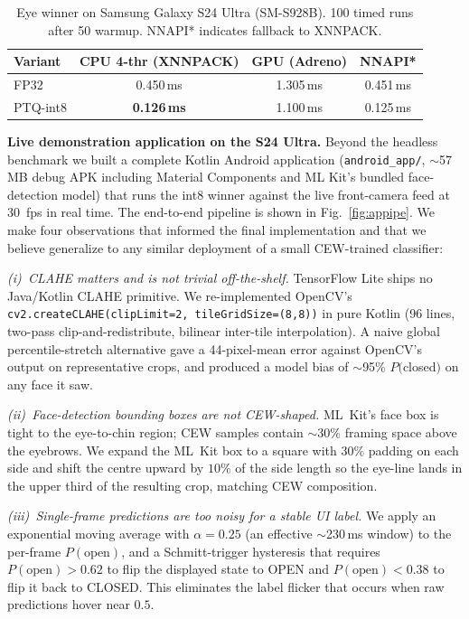 \documentclass[conference]{IEEEtran}
\begin{document}
\begin{table}[t]
\centering
\caption{Eye winner on Samsung Galaxy S24 Ultra (SM-S928B). 100 timed
runs after 50 warmup. NNAPI* indicates fallback to XNNPACK.}
\label{tab:eyedeploy}
\begin{tabular}{lccc}
\toprule
Variant & CPU 4-thr (XNNPACK) & GPU (Adreno) & NNAPI*\\
\midrule
FP32      & 0.450\,ms & 1.305\,ms & 0.451\,ms\\
PTQ-int8  & \textbf{0.126\,ms} & 1.100\,ms & 0.125\,ms\\
\bottomrule
\end{tabular}
\end{table}

\textbf{Live demonstration application on the S24 Ultra.}
Beyond the headless benchmark we built a complete Kotlin Android
application (\texttt{android\_app/}, $\sim$57\,MB debug APK including
Material Components and ML Kit's bundled face-detection model) that
runs the int8 winner against the live front-camera feed at 30~fps in
real time. The end-to-end pipeline is shown in
Fig.~\ref{fig:appipe}. We make four observations that informed
the final implementation and that we believe generalize to any
similar deployment of a small CEW-trained classifier:

\textit{(i)~CLAHE matters and is not trivial off-the-shelf.}
TensorFlow Lite ships no Java/Kotlin CLAHE primitive. We
re-implemented OpenCV's
\texttt{cv2.createCLAHE(clipLimit=2,\,tileGridSize=(8,8))} in pure
Kotlin (96 lines, two-pass clip-and-redistribute, bilinear
inter-tile interpolation). A naive global percentile-stretch
alternative gave a 44-pixel-mean error against OpenCV's output
on representative crops, and produced a model bias of $\sim$95\%
$P($closed$)$ on any face it saw.

\textit{(ii)~Face-detection bounding boxes are not CEW-shaped.}
ML~Kit's face box is tight to the eye-to-chin region; CEW samples
contain $\sim$30\% framing space above the eyebrows. We expand the
ML~Kit box to a square with $30\%$ padding on each side and shift
the centre upward by $10\%$ of the side length so the eye-line lands
in the upper third of the resulting crop, matching CEW composition.

\textit{(iii)~Single-frame predictions are too noisy for a stable
UI label.} We apply an exponential moving average with $\alpha = 0.25$
(an effective $\sim$230\,ms window) to the per-frame $P(\mathrm{open})$,
and a Schmitt-trigger hysteresis that requires $P(\mathrm{open}) > 0.62$
to flip the displayed state to OPEN and $P(\mathrm{open}) < 0.38$ to
flip it back to CLOSED. This eliminates the label flicker that occurs
when raw predictions hover near $0.5$.
\end{document}
